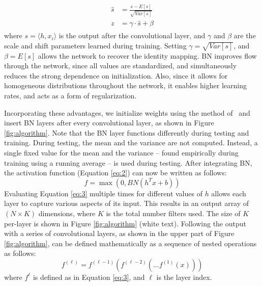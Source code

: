 \documentclass[final,3p,times,twocolumn,authoryear]{elsarticle}
\newcommand{\ie}{\textit{i}.\textit{e}.}
\begin{document}
\begin{align}
\label{eq:batchnorm}
\begin{split}
\hat{s} &= \frac{{s} -E[s]}{ \sqrt{Var[s]} }
\\
 z &= \gamma\cdot\hat{s}+\beta
\end{split}
\end{align}
where $s=\langle h{,}x_{i}\rangle$ is the output after the convolutional layer, and $\gamma$ and $\beta$ are the scale and shift parameters learned during training. 
Setting $\gamma= \sqrt{Var[s]}$, and $\beta=E[s]$ allows the network to recover the identity mapping.
BN improves flow through the network, since all values are standardized, and simultaneously reduces the strong dependence on initialization. 
Also, since it allows for homogeneous distributions throughout the network, it enables higher learning rates, and acts as a form of regularization. 

Incorporating these advantages, we initialize weights using the method of~\citet{pmlr-glorot10a} and insert BN layers after every convolutional layer, as shown in Figure \ref{fig:algorithm}. 
Note that the BN layer functions differently during testing and training. 
During testing, the mean and the variance are not computed. 
Instead, a single fixed value for the mean and the variance -- found empirically during training using a running average -- is used during testing. 
After integrating BN, the activation function (Equation \ref{eq:2}) can now be written as follows:
\begin{equation}
\label{eq:3}
f = \max(0,BN(h^Tx+b))
\end{equation}
Evaluating Equation \ref{eq:3} multiple times for different values of $h$ allows each layer to capture various aspects of its input. 
This results in an output array of $(N\times K)$ dimensions, where $K$ is the total number filters used. 
The size of $K$ per-layer is shown in Figure \ref{fig:algorithm} (white text). Following the output with a series of convolutional layers, as shown in the upper part of Figure \ref{fig:algorithm}, can be defined mathematically as a sequence of nested operations as follows:
\begin{equation}
\label{eq:4}
f^{(\ell)} = f^{(\ell-1)}(f^{(\ell-2)}(...f^{(1)}(x)))
\end{equation} 
where $f^{\ell}$ is defined as in Equation \ref{eq:3}, and $\ell$ is the layer index. 
\end{document}
